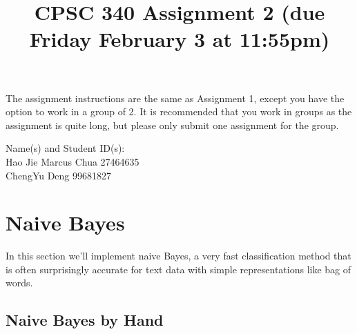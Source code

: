 \documentclass{article}
\def\blu#1{{\color{blu}#1}}
\begin{document}
\title{CPSC 340 Assignment 2 (due Friday February 3 at 11:55pm)}
\author{}
\date{}
\maketitle
\vspace{-4em}


The assignment instructions are the same as Assignment 1, except you have the option to work in a group of 2.
It is recommended that you work in groups as the assignment is quite long, but please only submit one assignment for the group.

\blu{Name(s) and Student ID(s): \\Hao Jie Marcus Chua 27464635\\ChengYu Deng 99681827}

\section{Naive Bayes}

In this section we'll implement naive Bayes, a very fast classification method that is often surprisingly accurate for text data with simple representations like bag of words.


\subsection{Naive Bayes by Hand}
\end{document}
